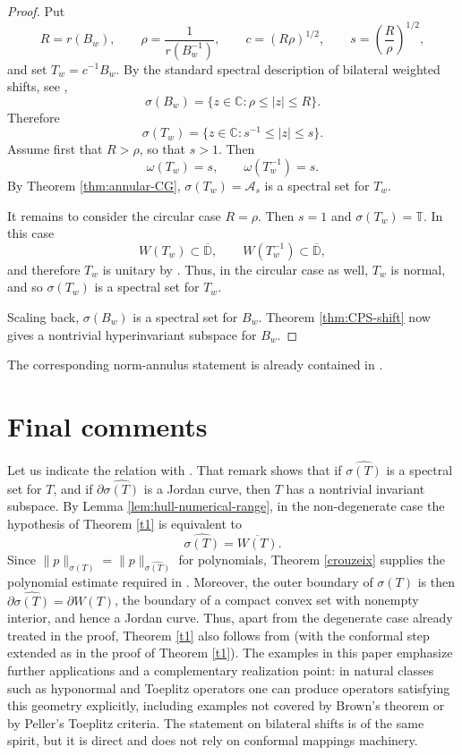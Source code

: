 \documentclass[11pt]{amsart}
\numberwithin{equation}{section}
\theoremstyle{definition}
\theoremstyle{remark}
\begin{document}
\begin{proof}
Put
\[
    R=r(B_w),\qquad \rho=\frac1{r(B_w^{-1})},\qquad
    c=(R\rho)^{1/2},\qquad s=\left(\frac R\rho\right)^{1/2},
\]
and set $T_w=c^{-1}B_w$. By the standard spectral description of bilateral
weighted shifts, see \cite[Theorem~5a]{Sh},
\[
    \sigma(B_w)=\{z\in\mathbb C:\rho\le |z|\le R\}.
\]
Therefore
\[
    \sigma(T_w)=\{z\in\mathbb C:s^{-1}\le |z|\le s\}.
\]
Assume first that $R>\rho$, so that $s>1$. Then
\[
    \omega(T_w)=s,
    \qquad
    \omega(T_w^{-1})=s.
\]
By Theorem \ref{thm:annular-CG}, $\sigma(T_w)=\mathcal A_s$ is a spectral set
for $T_w$.

It remains to consider the circular case $R=\rho$. Then $s=1$ and
$\sigma(T_w)=\mathbb T$. In this case
\[
    W(T_w)\subset \overline{\mathbb D},
    \qquad
    W(T_w^{-1})\subset \overline{\mathbb D},
\]
and therefore $T_w$ is unitary by \cite[Corollary~1]{StampfliThin}. Thus, in
the circular case as well, $T_w$ is normal, and so $\sigma(T_w)$ is a spectral
set for $T_w$.

Scaling back, $\sigma(B_w)$ is a spectral set for $B_w$. Theorem
\ref{thm:CPS-shift} now gives a nontrivial hyperinvariant subspace for $B_w$.
\end{proof}

The corresponding norm-annulus statement is already contained in
\cite[Theorem~6.2]{CPS}.

\section{Final comments}\label{sec:final-comments}
Let us indicate the relation with \cite[Remark]{KL}. That remark shows
that if \(\widehat{\sigma(T)}\) is a spectral set for \(T\), and if
\(\partial\widehat{\sigma(T)}\) is a Jordan curve, then \(T\) has a
nontrivial invariant subspace.
 By Lemma
\ref{lem:hull-numerical-range}, in the non-degenerate case the hypothesis of
Theorem \ref{t1} is equivalent to
\[
        \widehat{\sigma(T)}=\overline{W(T)}.
\]
Since $\|p\|_{\sigma(T)}=\|p\|_{\widehat{\sigma(T)}}$ for polynomials,
Theorem \ref{crouzeix} supplies the polynomial estimate required in
\cite[Remark]{KL}. Moreover, the outer boundary of $\sigma(T)$ is then
$\partial\widehat{\sigma(T)}=\partial W(T)$, the boundary of a compact
convex set with nonempty interior, and hence a Jordan curve. Thus, apart from
the degenerate case already treated in the proof, Theorem \ref{t1} also
follows from \cite[Remark]{KL} (with the conformal step extended as in the proof of Theorem \ref{t1}). The examples in this paper emphasize further applications and a complementary
realization point: in natural classes such as hyponormal and Toeplitz operators
one can produce operators satisfying this geometry explicitly, including
examples not covered by Brown's theorem or by Peller's Toeplitz criteria.
The statement on bilateral shifts is of the same spirit, but it is direct and 
does not rely on conformal mappings machinery. 
\end{document}
